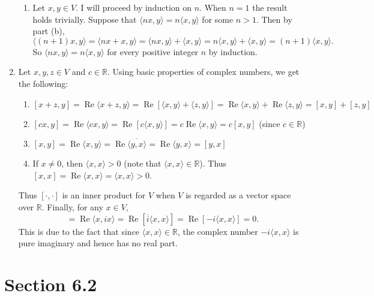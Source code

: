 \documentclass[12pt]{article}
\renewcommand\Re{\operatorname{Re}}
\begin{document}
\begin{enumerate}
\begin{enumerate}
\item
Let $x, y \in V$. I will proceed by induction on $n$. When $n = 1$ the result holds trivially. Suppose that $\langle nx, y \rangle = n \langle x, y \rangle$ for some $n > 1$. Then by part (b),
\begin{equation*}
\langle (n+1)x, y \rangle = \langle nx + x, y \rangle = \langle nx, y \rangle + \langle x, y \rangle = n \langle x, y \rangle + \langle x, y \rangle = (n+1)\langle x, y \rangle.
\end{equation*}
So $\langle nx, y \rangle = n \langle x, y \rangle$ for every positive integer $n$ by induction.

\end{enumerate}

\setcounter{enumi}{27}
\item
Let $x, y, z \in V$ and $c \in \mathbb{R}$. Using basic properties of complex numbers, we get the following:
\begin{enumerate}
\item
$[x+z, y] = \Re \langle x+z, y \rangle = \Re [\langle x, y \rangle + \langle z, y \rangle] = \Re \langle x, y \rangle + \Re \langle z, y \rangle = [x, y] + [z, y]$
\item
$[cx, y] = \Re \langle cx, y \rangle = \Re [c \langle x, y \rangle] = c \Re \langle x, y \rangle = c[x, y]$ (since $c \in \mathbb{R}$)
\item
$[x, y] = \Re \langle x, y \rangle = \Re \overline{\langle y, x \rangle} = \Re \langle y, x \rangle = [y, x]$
\item
If $x \neq 0$, then $\langle x, x \rangle > 0$ (note that $\langle x, x \rangle \in \mathbb{R}$). Thus $[x, x] = \Re \langle x, x \rangle = \langle x, x \rangle > 0$.
\end{enumerate}
Thus $[\cdot, \cdot]$ is an inner product for $V$ when $V$ is regarded as a vector space over $\mathbb{R}$. Finally, for any $x \in V$,
\begin{equation*}
[x, ix] = \Re \langle x, ix \rangle = \Re [\overline{i} \langle x, x \rangle] = \Re [-i\langle x, x \rangle] = 0.
\end{equation*}
This is due to the fact that since $\langle x, x \rangle \in \mathbb{R}$, the complex number $-i\langle x, x \rangle$ is pure imaginary and hence has no real part.

\end{enumerate}

\section*{Section 6.2}
\end{document}

